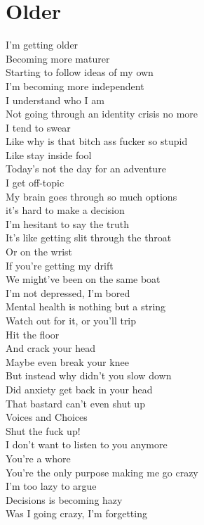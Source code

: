 \documentclass[12pt, b5paper]{article}
\begin{document}
\section{Older}
I'm getting older
\\Becoming more maturer
\\Starting to follow ideas of my own
\\I'm becoming more independent
\\I understand who I am
\\Not going through an identity crisis no more
\\I tend to swear
\\Like why is that bitch ass fucker so stupid
\\Like stay inside fool
\\Today's not the day for an adventure
\\I get off-topic
\\My brain goes through so much options
\\it's hard to make a decision
\\I'm hesitant to say the truth
\\It's like getting slit through the throat
\\Or on the wrist
\\If you're getting my drift
\\We might've been on the same boat
\\I'm not depressed, I'm bored
\\Mental health is nothing but a string
\\Watch out for it, or you'll trip
\\Hit the floor
\\And crack your head
\\Maybe even break your knee
\\But instead why didn't you slow down
\\Did anxiety get back in your head
\\That bastard can't even shut up
\\Voices and Choices
\\Shut the fuck up!
\\I don't want to listen to you anymore
\\You're a whore
\\You're the only purpose making me go crazy
\\I'm too lazy to argue
\\Decisions is becoming hazy
\\Was I going crazy, I'm forgetting
\end{document}
